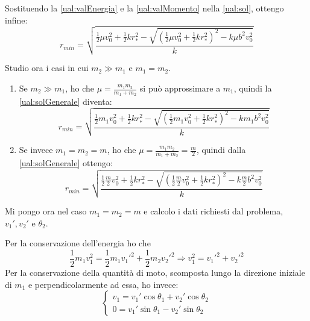 \documentclass[../main.tex]{subfiles}
\begin{document}
Sostituendo la \cref{ual:valEnergia} e la \cref{ual:valMomento} nella \cref{ual:sol}, ottengo infine:
\begin{equation} \label{ual:solGenerale}
	r_{min}=\sqrt{\frac{\frac12\mu v_0^2+\frac12 kr_*^2-\sqrt{(\frac12\mu v_0^2+\frac12 kr_*^2)^2-k\mu b^2v_0^2}}{k}}
\end{equation}

Studio ora i casi in cui $m_2\gg m_1$ e $m_1=m_2$.
\begin{enumerate}
	\item Se $m_2\gg m_1$, ho che $\mu=\frac{m_1m_2}{m_1+m_2}$ si può approssimare a $m_1$, quindi la \cref{ual:solGenerale} diventa:
	\begin{equation*}
		r_{min}=\sqrt{\frac{\frac12m_1 v_0^2+\frac12 kr_*^2-\sqrt{(\frac12m_1 v_0^2+\frac12 kr_*^2)^2-km_1 b^2v_0^2}}{k}}
	\end{equation*}
	\item Se invece $m_1=m_2=m$, ho che $\mu=\frac{m_1m_2}{m_1+m_2}=\frac m2$, quindi dalla \cref{ual:solGenerale} ottengo:
	\begin{equation*}
		r_{min}=\sqrt{\frac{\frac12\frac m2 v_0^2+\frac12 kr_*^2-\sqrt{(\frac12\frac m2 v_0^2+\frac12 kr_*^2)^2-k\frac m2 b^2v_0^2}}{k}}
	\end{equation*}
\end{enumerate}

Mi pongo ora nel caso $m_1=m_2=m$ e calcolo i dati richiesti dal problema, $v_1',v_2'$ e $\theta_2$.

Per la conservazione dell'energia ho che
\begin{equation} \label{ual:consEn}
	\frac 12 m_1v_1^2=\frac 12 m_1v_1'^2+\frac 12 m_2v_2'^2 \Longrightarrow v_1^2=v_1'^2+v_2'^2
\end{equation}
Per la conservazione della quantità di moto, scomposta lungo la direzione iniziale di $m_1$ e perpendicolarmente ad essa, ho invece:
\begin{equation} \label{ual:consQM}
	\begin{cases}
		v_1=v_1'\cos\theta_1+v_2'\cos\theta_2 \\
		0=v_1'\sin\theta_1-v_2'\sin\theta_2
	\end{cases}
\end{equation}
\end{document}

